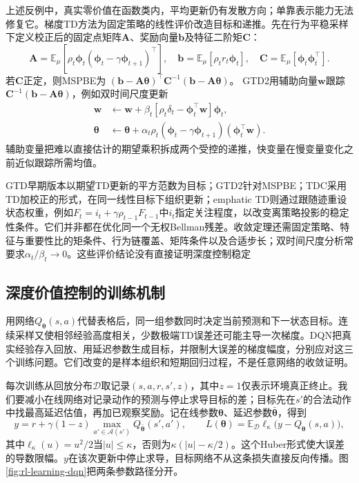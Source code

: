 上述反例中，真实零价值在函数类内，平均更新仍有发散方向；单靠表示能力无法修复它。梯度TD方法为固定策略的线性评价改造目标和递推。先在行为平稳采样下定义校正后的固定点矩阵$\bm A$、奖励向量$\bm b$及特征二阶矩$\bm C$：
\[
  \bm{A}=\mathbb E_\mu[\rho_t\bm{\phi}_t
          (\bm{\phi}_t-\gamma\bm{\phi}_{t+1})^\top],\quad
  \bm{b}=\mathbb E_\mu[\rho_t r_t\bm{\phi}_t],\quad
  \bm{C}=\mathbb E_\mu[\bm{\phi}_t\bm{\phi}_t^\top].
\]
若$\bm C$正定，则MSPBE为
$(\bm b-\bm A\bm\theta)^\top\bm C^{-1}
 (\bm b-\bm A\bm\theta)$。
GTD2用辅助向量$\bm w$跟踪$\bm C^{-1}(\bm b-\bm A\bm\theta)$，例如双时间尺度更新
\begin{align}
  \bm w&\leftarrow\bm w+\beta_t
     [\rho_t\delta_t-\bm\phi_t^\top\bm w]\bm\phi_t,
     \nonumber\\
  \bm\theta&\leftarrow\bm\theta+\alpha_t\rho_t
     (\bm\phi_t-\gamma\bm\phi_{t+1})(\bm\phi_t^\top\bm w).
  \label{eq:rl-learning-gtd2}
\end{align}
辅助变量把难以直接估计的期望乘积拆成两个受控的递推，快变量在慢变量变化之前近似跟踪所需均值。

GTD早期版本以期望TD更新的平方范数为目标；GTD2针对MSPBE；TDC采用TD加校正的形式，在同一线性目标下组织更新；emphatic TD则通过跟随迹重设状态权重，例如$F_t=i_t+\gamma\rho_{t-1}F_{t-1}$中$i_t$指定关注程度，以改变离策略投影的稳定性条件。它们并非都在优化同一个无权Bellman残差。收敛定理还需固定策略、特征与重要性比的矩条件、行为链覆盖、矩阵条件以及合适步长；双时间尺度分析常要求$\alpha_t/\beta_t\to0$。这些评价结论没有直接证明深度控制稳定

\subsection{深度价值控制的训练机制}
\label{sec:rl-learning-dqn}

用网络$Q_{\bm\theta}(s,a)$代替表格后，同一组参数同时决定当前预测和下一状态目标。连续采样又使相邻经验高度相关，少数极端TD误差还可能主导一次梯度。DQN把真实经验存入回放、用延迟参数生成目标，并限制大误差的梯度幅度，分别应对这三个训练问题。它们改变的是样本组织和短期回归过程，不是任意网络的收敛证明。

每次训练从回放分布$\mathcal D$取记录$(s,a,r,s',z)$，其中$z=1$仅表示环境真正终止。我们要减小在线网络对记录动作的预测与停止求导目标的差；目标先在$s'$的合法动作中找最高延迟估值，再加已观察奖励。记在线参数$\bm\theta$、延迟参数$\bar{\bm\theta}$，得到
\begin{equation}
  y=r+\gamma(1-z)\max_{a'\in\mathcal A(s')}Q_{\bar{\bm\theta}}(s',a'),
  \qquad
  L(\bm\theta)=\mathbb E_{\mathcal D}
       \ell_\kappa\bigl(y-Q_{\bm\theta}(s,a)\bigr),
  \label{eq:rl-learning-dqn-loss}
\end{equation}
其中$\ell_\kappa(u)=u^2/2$当$|u|\leq\kappa$，否则为$\kappa(|u|-\kappa/2)$。这个Huber形式使大误差的导数限幅。$y$在该次更新中停止求导，目标网络不从这条损失直接反向传播。图\ref{fig:rl-learning-dqn}把两条参数路径分开。

